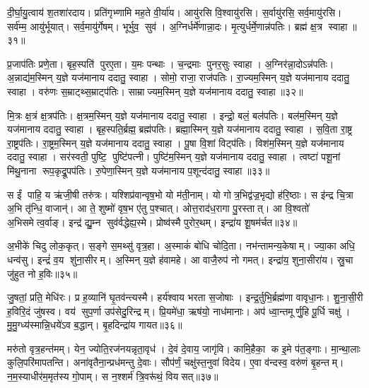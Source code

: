 दी॒र्घा॒यु॒त्वाय॑ श॒तशा॑रदाय। प्रति॑गृभ्णामि मह॒ते वी॒र्या॑य। आयु॑रसि वि॒श्वायु॑रसि। स॒र्वायु॑रसि॒ सर्व॒मायु॑रसि। सर्व॑म्म॒ आयु॑र्भूयात्। सर्व॒मायु॑र्गेषम्। भूर्भुव॒ सुव॑। अ॒ग्निर्धर्मे॑णान्ना॒दः। मृ॒त्युर्धर्मे॒णान्न॑पतिः। ब्रह्म॑ क्ष॒त्र स्वाहा॥३१॥

प्र॒जाप॑तिः प्रणे॒ता। बृह॒स्पति॑ पुरए॒ता। य॒मः पन्थाः। च॒न्द्रमाः पुनर॒सुः स्वाहा। अ॒ग्निर॑न्ना॒दोऽन्न॑पतिः। अ॒न्नाद्य॑म॒स्मिन् य॒ज्ञे यज॑मानाय ददातु॒ स्वाहा। सोमो॒ राजा॒ राज॑पतिः। रा॒ज्यम॒स्मिन् य॒ज्ञे यज॑मानाय ददातु॒ स्वाहा। वरु॑णः स॒म्राट्थ्स॒म्राट्प॑तिः। साम्राज्यम॒स्मिन् य॒ज्ञे यज॑मानाय ददातु॒ स्वाहा॥३२॥

मि॒त्रः क्ष॒त्रं क्ष॒त्रप॑तिः। क्ष॒त्रम॒स्मिन् य॒ज्ञे यज॑मानाय ददातु॒ स्वाहा। इन्द्रो॒ बलं॒ बल॑पतिः। बल॑म॒स्मिन् य॒ज्ञे यज॑मानाय ददातु॒ स्वाहा। बृह॒स्पति॒र्ब्रह्म॒ ब्रह्म॑पतिः। ब्रह्मा॒स्मिन् य॒ज्ञे यज॑मानाय ददातु॒ स्वाहा। स॒वि॒ता रा॒ष्ट्र रा॒ष्ट्रप॑तिः। रा॒ष्ट्रम॒स्मिन् य॒ज्ञे यज॑मानाय ददातु॒ स्वाहा। पू॒षा वि॒शां विट्प॑तिः। विश॑म॒स्मिन् य॒ज्ञे यज॑मानाय ददातु॒ स्वाहा। सर॑स्वती॒ पुष्टि॒ पुष्टि॑पत्नी। पुष्टि॑म॒स्मिन् य॒ज्ञे यज॑मानाय ददातु॒ स्वाहा। त्वष्टा॑ पशू॒नां मि॑थु॒नाना रूप॒कृद्रू॒पप॑तिः। रु॒पेणा॒स्मिन् य॒ज्ञे यज॑मानाय प॒शून्द॑दातु॒ स्वाहा॥३३॥\anuvakamend[च॒ स्वाहा॒ साम्राज्यम॒स्मिन् य॒ज्ञे यज॑मानाय ददातु॒ स्वाहा॒ विश॑म॒स्मिन् य॒ज्ञे यज॑मानाय ददातु॒ स्वाहा॑ च॒त्वारि॑ च (अ॒ग्निः सोमो॒ वरु॑णो मि॒त्र इन्द्रो॒ बृह॒स्पति॑ सवि॒ता पू॒षा सर॑स्वती॒ त्वष्टा॒ दश॑ ॥ )]

स ईं पाहि॒ य ऋ॑जी॒षी तरु॑त्रः। यश्शिप्र॑वान्वृष॒भो यो म॑ती॒नाम्। यो गोत्र॒भिद्व॑ज्र॒भृद्यो ह॑रि॒ष्ठाः। स इ॑न्द्र चि॒त्रा अ॒भि तृ॑न्धि॒ वाजान्॑। आ ते॒ शुष्मो॑ वृष॒भ ए॑तु प॒श्चात्। ओत्त॒राद॑ध॒रागा पु॒रस्तात्। आ वि॒श्वतो॑ अ॒भिसमेत्व॒र्वाङ्। इन्द्र॑ द्यु॒म्न सुव॑र्वद्धेह्य॒स्मे। प्रोष्व॑स्मै पुरोर॒थम्। इन्द्रा॑य शू॒षम॑र्चत॥३४॥

अ॒भीके॑ चिदु लोक॒कृत्। स॒ङ्गे स॒मथ्सु॑ वृत्र॒हा। अ॒स्माकं॑ बोधि चोदि॒ता। नभ॑न्तामन्य॒केषाम्। ज्या॒का अधि॒ धन्व॑सु। इन्द्रं॑ व॒य शु॑ना॒सीरम्। अ॒स्मिन् य॒ज्ञे ह॑वामहे। आ वाजै॒रुप॑ नो गमत्। इन्द्रा॑य॒ शुना॒सीरा॑य। स्रु॒चा जु॑हुत नो ह॒विः॥३५॥

जु॒षतां॒ प्रति॒ मेधि॑रः। प्र ह॒व्यानि॑ घृ॒तव॑न्त्यस्मै। हर्य॑श्वाय भरता स॒जोषाः। इन्द्र॒र्तुभि॒र्ब्रह्म॑णा वावृधा॒नः। शु॒ना॒सी॒री ह॒विरि॒दं जु॑षस्व। वय॑ सुप॒र्णा उप॑सेदु॒रिन्द्रम्। प्रि॒यमे॑धा॒ ऋष॑यो॒ नाध॑मानाः। अप॑ ध्वा॒न्तमूर्णु॒हि पू॒र्धि चक्षु॑। मु॒मु॒ग्ध्य॑स्मान्नि॒धये॑ऽव ब॒द्धान्। बृ॒हदिन्द्रा॑य गायत॥३६॥

मरु॑तो वृत्र॒हन्त॑मम्। येन॒ ज्योति॒रज॑नयन्नृता॒वृध॑। दे॒वं दे॒वाय॒ जागृ॑वि। कामि॒हैका॒ क इ॒मे प॑त॒ङ्गाः। मा॒न्था॒लाः कुलि॒परि॑मापतन्ति। अना॑वृतैना॒न्प्रध॑मन्तु दे॒वाः। सौप॑र्णं॒ चक्षु॑स्त॒नुवा॑ विदेय। ए॒वा व॑न्दस्व॒ वरु॑णं बृ॒हन्तम्। न॒म॒स्याधीर॑म॒मृत॑स्य गो॒पाम्। स न॒श्शर्म॑ त्रि॒वरू॑थं॒ वियसत्॥३७॥

